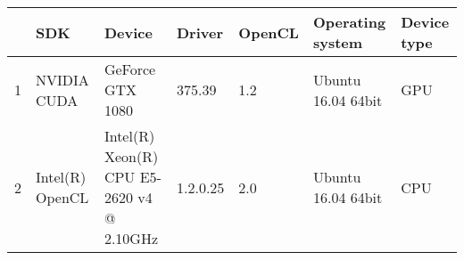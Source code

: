 \begin{tabular}{lllllll}
\toprule
{} &              SDK &                                     Device &    Driver & OpenCL &    Operating system & Device type \\
\midrule
1 &      NVIDIA CUDA &                           GeForce GTX 1080 &    375.39 &    1.2 &  Ubuntu 16.04 64bit &         GPU \\
2 &  Intel(R) OpenCL &  Intel(R) Xeon(R) CPU E5-2620 v4 @ 2.10GHz &  1.2.0.25 &    2.0 &  Ubuntu 16.04 64bit &         CPU \\
\bottomrule
\end{tabular}

